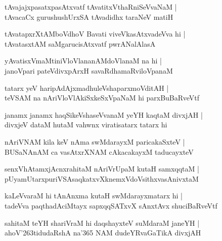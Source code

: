\documentclass[twoside,12pt,openright]{book}
\def\S{\char'263}
\newcounter{shloka}[chapter]
\begin{document}
\begin{shloka}
tAvajajxpasatxpasAtxvatf tAvatitxVthaRniSeVvaNaM |\\
tAvacaCx gurushushUrxSA tAvadidhx taraNeV matiH 
\end{shloka}

\begin{shloka}
tAvatapxrXtAMboVdhoV Bavati viveVkasAtxvadeVva hi |\\
tAvatasxtAM saMgarucisAtxvatf pwrANalAlasA 
\end{shloka}

\begin{shloka}
yAvatisxVmaMtiniVloVlananAMdoVlanaM na hi |\\
janoVpari pateVdivxpArxH savaRdhamaRviloVpanaM 
\end{shloka}

\begin{shloka}
tatarx yeV haripAdAjxmadhuleVshaparxmoVditAH |\\
teVSAM na nAriVloVlAkiSxkeSxVpaNaM hi parxBuBaRveVtf 
\end{shloka}

\begin{shloka}
janamx janamx haqSikeVshaseVvanaM yeYH kaqtaM divxjAH |\\
divxjeV dataM hutaM vahwnx viratisatarx tatarx hi 
\end{shloka}

\begin{shloka}
nAriVNAM kila keV nAma swMdarayxM  paricakaSxteV |\\
BUSaNAnAM ca vasAtxrXNAM cAkacakayxM taducayxteV 
\end{shloka}

\begin{shloka}
senxVhAtamxjAcnxrahitaM nAriVrUpaM kutaH samxqqtaM |\\
pUyamUtarxpuriVSAsaqkatxvXknemxVdoVsithxvasAnivxtaM 
\end{shloka}

\begin{shloka}
kaLeVvaraM hi tAnAnxma kutaH swMdarayxmatarx hi |\\
tadeVva paqthadAciMtayx sapxqqSATxvX sAnxtAvx shuciBaRveVtf 
\end{shloka}

\begin{shloka}
sahitaM teYH shariVraM hi daqshayxteV suMdaraM janeYH |\\
ahoV\S tidudaRshA na\char'365 NAM dudeYRvaGaTikA divxjAH 
\end{shloka}
\end{document}
